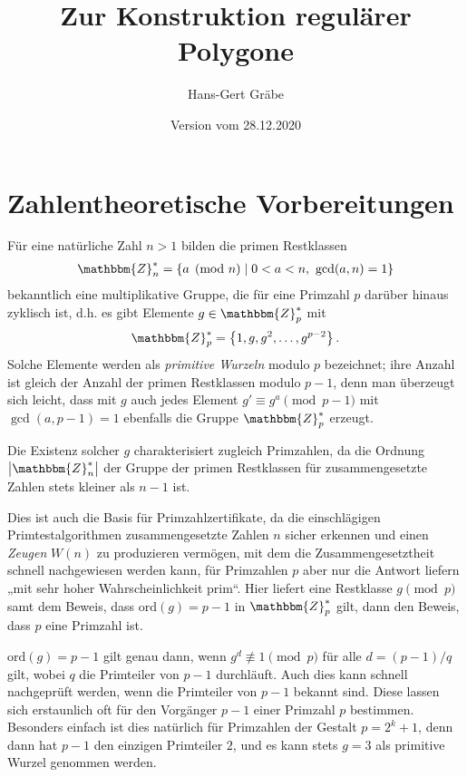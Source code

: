 \documentclass[11pt]{article}
\author{Hans-Gert Gräbe}
\title{Zur Konstruktion regulärer Polygone}
\date{Version vom 28.12.2020}
\newcommand{\cbr}[1]{\ensuremath{\left\{#1\right\}}}
\newcommand{\Z}{\mathbbm{Z}}
\begin{document}
 
\maketitle         

\section{Zahlentheoretische Vorbereitungen}

Für eine natürliche Zahl $n>1$ bilden die primen Restklassen
\begin{gather*}
  \Z_n^\ast=\cbr{a \pmod n \mid 0<a<n,\ \gcd(a,n)=1}
\end{gather*}
bekanntlich eine multiplikative Gruppe, die für eine Primzahl $p$ darüber
hinaus zyklisch ist, d.h. es gibt Elemente $g\in \Z_p^\ast$ mit
\begin{gather*}
  \Z_p^\ast=\cbr{1,g,g^2,\dots,g^{p-2}}.
\end{gather*}
Solche Elemente werden als \emph{primitive Wurzeln} modulo $p$ bezeichnet;
ihre Anzahl ist gleich der Anzahl der primen Restklassen modulo $p-1$, denn
man überzeugt sich leicht, dass mit $g$ auch jedes Element $g'\equiv g^a
\pmod{p-1}$ mit $\gcd(a,p-1)=1$ ebenfalls die Gruppe $\Z_p^\ast$ erzeugt.

Die Existenz solcher $g$ charakterisiert zugleich Primzahlen, da die Ordnung
$\left|\Z_n^\ast\right|$ der Gruppe der primen Restklassen für
zusammengesetzte Zahlen stets kleiner als $n-1$ ist.

Dies ist auch die Basis für Primzahlzertifikate, da die einschlägigen
Primtestalgorithmen zusammengesetzte Zahlen $n$ sicher erkennen und einen
\emph{Zeugen} $W(n)$ zu produzieren vermögen, mit dem die Zusammengesetztheit
schnell nachgewiesen werden kann, für Primzahlen $p$ aber nur die Antwort
liefern „mit sehr hoher Wahrscheinlichkeit prim“. Hier liefert eine Restklasse
$g \pmod p$ samt dem Beweis, dass $\mathrm{ord}(g)=p-1$ in $\Z_p^\ast$ gilt,
dann den Beweis, dass $p$ eine Primzahl ist.

$\mathrm{ord}(g)=p-1$ gilt genau dann, wenn $g^d\not\equiv 1\pmod p$ für alle
$d=(p-1)/q$ gilt, wobei $q$ die Primteiler von $p-1$ durchläuft. Auch dies
kann schnell nachgeprüft werden, wenn die Primteiler von $p-1$ bekannt sind.
Diese lassen sich erstaunlich oft für den Vorgänger $p-1$ einer Primzahl $p$
bestimmen. Besonders einfach ist dies natürlich für Primzahlen der Gestalt
$p=2^k+1$, denn dann hat $p-1$ den einzigen Primteiler $2$, und es kann stets
$g=3$ als primitive Wurzel genommen werden. 
\end{document}
